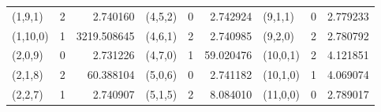 \documentclass[11pt]{article}
\theoremstyle{definition}
\begin{document}
\begin{center}
\begin{tabular}{lcr@{\qquad}lcr@{\qquad}lcr}
(1,9,1) & 2 & 2.740160 & (4,5,2) & 0 & 2.742924 & (9,1,1) & 0 & 2.779233 \\
(1,10,0) & 1 & 3219.508645 & (4,6,1) & 2 & 2.740985 & (9,2,0) & 2 & 2.780792 \\
(2,0,9) & 0 & 2.731226 & (4,7,0) & 1 & 59.020476 & (10,0,1) & 2 & 4.121851 \\
(2,1,8) & 2 & 60.388104 & (5,0,6) & 0 & 2.741182 & (10,1,0) & 1 & 4.069074 \\
(2,2,7) & 1 & 2.740907 & (5,1,5) & 2 & 8.084010 & (11,0,0) & 0 & 2.789017 \\
\bottomrule
\end{tabular}
\end{center}
\end{document}

